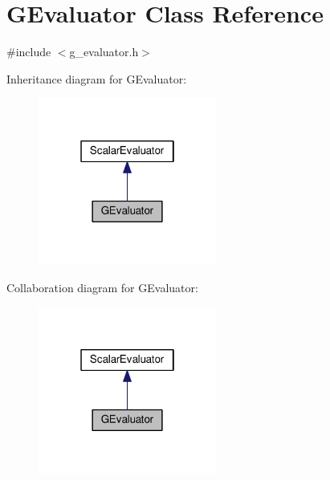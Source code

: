 \hypertarget{classGEvaluator}{\section{G\-Evaluator Class Reference}
\label{classGEvaluator}
}


{\ttfamily \#include $<$g\-\_\-evaluator.\-h$>$}



Inheritance diagram for G\-Evaluator\-:
\nopagebreak
\begin{figure}[H]
\begin{center}
\leavevmode
\includegraphics[width=166pt]{classGEvaluator__inherit__graph}
\end{center}
\end{figure}


Collaboration diagram for G\-Evaluator\-:
\nopagebreak
\begin{figure}[H]
\begin{center}
\leavevmode
\includegraphics[width=166pt]{classGEvaluator__coll__graph}
\end{center}
\end{figure}
